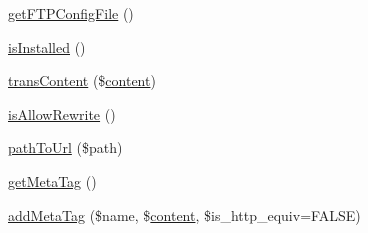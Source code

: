 \begin{DoxyCompactItemize}
\hyperlink{classContext_ab7bb799f55be29174c8a15659dab823a}{get\-F\-T\-P\-Config\-File} ()
\item 
\hyperlink{classContext_a5a8714e3a0f9d4722a31ce73017c6613}{is\-Installed} ()
\item 
\hyperlink{classContext_a4767b003bd726a994b1bf6bf68a3bb7e}{trans\-Content} (\$\hyperlink{classcontent}{content})
\item 
\hyperlink{classContext_aa11482b69f0892e9e8013e08c9914ff4}{is\-Allow\-Rewrite} ()
\item 
\hyperlink{classContext_a6012ceb6e62fc99b0e2b24e475ba4da7}{path\-To\-Url} (\$path)
\item 
\hyperlink{classContext_a8ee4ad4396e92a54d2aa7d079771619f}{get\-Meta\-Tag} ()
\item 
\hyperlink{classContext_aeae29df3bedc1f90a497d34543a08f7f}{add\-Meta\-Tag} (\$name, \$\hyperlink{classcontent}{content}, \$is\-\_\-http\-\_\-equiv=F\-A\-L\-S\-E)
\end{DoxyCompactItemize}
